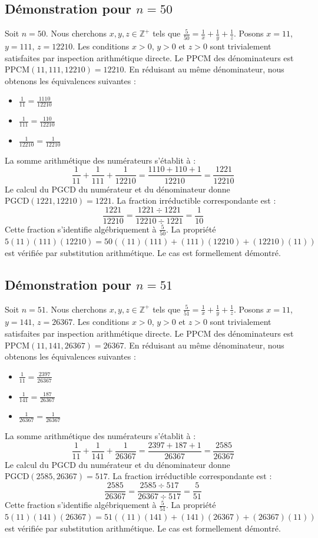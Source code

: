 \documentclass[12pt,a4paper]{article}
\begin{document}
\subsection{Démonstration pour $n = 50$}
Soit $n = 50$. Nous cherchons $x, y, z \in \mathbb{Z}^{+}$ tels que $\frac{5}{50} = \frac{1}{x} + \frac{1}{y} + \frac{1}{z}$.
Posons $x = 11$, $y = 111$, $z = 12210$.
Les conditions $x > 0$, $y > 0$ et $z > 0$ sont trivialement satisfaites par inspection arithmétique directe.
Le PPCM des dénominateurs est $\text{PPCM}(11, 111, 12210) = 12210$.
En réduisant au même dénominateur, nous obtenons les équivalences suivantes :
\begin{itemize}
    \item $\frac{1}{11} = \frac{1110}{12210}$
    \item $\frac{1}{111} = \frac{110}{12210}$
    \item $\frac{1}{12210} = \frac{1}{12210}$
\end{itemize}
La somme arithmétique des numérateurs s'établit à :
$$ \frac{1}{11} + \frac{1}{111} + \frac{1}{12210} = \frac{1110 + 110 + 1}{12210} = \frac{1221}{12210} $$
Le calcul du PGCD du numérateur et du dénominateur donne $\text{PGCD}(1221, 12210) = 1221$.
La fraction irréductible correspondante est :
$$ \frac{1221}{12210} = \frac{1221 \div 1221}{12210 \div 1221} = \frac{1}{10} $$
Cette fraction s'identifie algébriquement à $\frac{5}{50}$.
La propriété $5(11)(111)(12210) = 50((11)(111) + (111)(12210) + (12210)(11))$ est vérifiée par substitution arithmétique.
Le cas est formellement démontré.

\subsection{Démonstration pour $n = 51$}
Soit $n = 51$. Nous cherchons $x, y, z \in \mathbb{Z}^{+}$ tels que $\frac{5}{51} = \frac{1}{x} + \frac{1}{y} + \frac{1}{z}$.
Posons $x = 11$, $y = 141$, $z = 26367$.
Les conditions $x > 0$, $y > 0$ et $z > 0$ sont trivialement satisfaites par inspection arithmétique directe.
Le PPCM des dénominateurs est $\text{PPCM}(11, 141, 26367) = 26367$.
En réduisant au même dénominateur, nous obtenons les équivalences suivantes :
\begin{itemize}
    \item $\frac{1}{11} = \frac{2397}{26367}$
    \item $\frac{1}{141} = \frac{187}{26367}$
    \item $\frac{1}{26367} = \frac{1}{26367}$
\end{itemize}
La somme arithmétique des numérateurs s'établit à :
$$ \frac{1}{11} + \frac{1}{141} + \frac{1}{26367} = \frac{2397 + 187 + 1}{26367} = \frac{2585}{26367} $$
Le calcul du PGCD du numérateur et du dénominateur donne $\text{PGCD}(2585, 26367) = 517$.
La fraction irréductible correspondante est :
$$ \frac{2585}{26367} = \frac{2585 \div 517}{26367 \div 517} = \frac{5}{51} $$
Cette fraction s'identifie algébriquement à $\frac{5}{51}$.
La propriété $5(11)(141)(26367) = 51((11)(141) + (141)(26367) + (26367)(11))$ est vérifiée par substitution arithmétique.
Le cas est formellement démontré.
\end{document}
